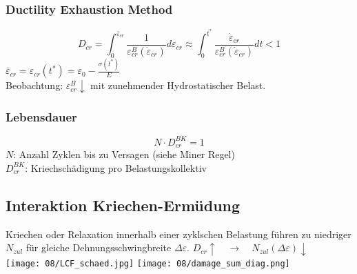         \subsubsection{Ductility Exhaustion Method}
            \[\boxed{D_{cr}=\int_0^{\bar{\varepsilon}_{cr}}\frac{1}{\varepsilon_{cr}^B(\dot{\varepsilon}_{cr})}d\varepsilon_{cr} \approx \int_0^{t^{\ast}}\frac{\dot{\varepsilon}_{cr}}{\varepsilon_{cr}^B(\dot{\varepsilon}_{cr})}dt< 1}\]
            $\bar{\varepsilon}_{cr}=\varepsilon_{cr}(t^{*})=\varepsilon_0-\frac{\sigma(t^{*})}{E}$
            \\Beobachtung: $\varepsilon_{cr}^{B}\downarrow$ mit zunehmender Hydrostatischer Belast.
        \subsubsection{Lebensdauer}
            \[N\cdot D_{cr}^{BK} = 1\]
            $N$: Anzahl Zyklen bis zu Versagen (siehe Miner Regel)
            \\$D_{cr}^{BK}$: Kriechschädigung pro Belastungskollektiv
\vfill\null\columnbreak
    \subsection{Interaktion Kriechen-Ermüdung}
        Kriechen oder Relaxation innerhalb einer zyklschen Belastung führen zu niedriger $N_{zul}$ für gleiche Dehnungsschwingbreite $\Delta\varepsilon$. $D_{cr}\uparrow \quad\rightarrow\quad N_{zul}(\Delta\varepsilon)\downarrow$\\
            \texttt{[image: 08/LCF\_schaed.jpg]}
            \texttt{[image: 08/damage\_sum\_diag.png]}
        